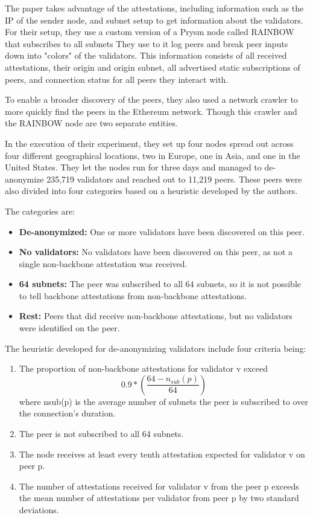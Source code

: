 The paper takes advantage of the attestations, including information such as the IP of the sender node, and subnet setup to get information about the validators.
For their setup, they use a custom version of a Prysm node called RAINBOW that subscribes to all subnets
They use to it log peers and break peer inputs down into "colors" of the validators.
This information consists of all received attestations, their origin and origin subnet, all advertised static subscriptions of peers, and connection status for all peers they interact with.

To enable a broader discovery of the peers, they also used a network crawler to more quickly find the peers in the Ethereum network.
Though this crawler and the RAINBOW node are two separate entities.

In the execution of their experiment, they set up four nodes spread out across four different geographical locations, two in Europe, one in Asia, and one in the United States.
They let the nodes run for three days and managed to de-anonymize 235,719 validators and reached out to 11,219 peers.
These peers were also divided into four categories based on a heuristic developed by the authors.

The categories are:
\begin{itemize}
    \item \textbf{De-anonymized:} One or more validators have been discovered on this peer.
    \item \textbf{No validators:} No validators have been discovered on this peer, as not a single non-backbone attestation was received.
    \item \textbf{64 subnets:} The peer was subscribed to all 64 subnets, so it is not possible to tell backbone attestations from non-backbone attestations.
    \item \textbf{Rest:} Peers that did receive non-backbone attestations, but no validators were identified on the peer.
\end{itemize}

The heuristic developed for de-anonymizing validators include four criteria being:
\begin{enumerate}
    \item The proportion of non-backbone attestations for validator v exceed
    \begin{equation}
        0.9*\left(\frac{64-n_{sub}(p)}{64}\right)
        \label{eq:heurestic}
    \end{equation} where nsub(p) is the average number of subnets the peer is subscribed to over the connection’s duration.
    \item The peer is not subscribed to all 64 subnets.
    \item The node receives at least every tenth attestation expected for validator v on peer p.
    \item The number of attestations received for validator v from the peer p exceeds the mean number of attestations per validator from peer p by two standard deviations.
\end{enumerate}